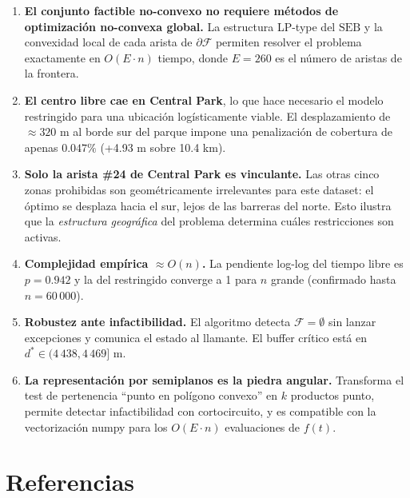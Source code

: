 \documentclass[11pt,a4paper]{article}
\theoremstyle{definition}
\theoremstyle{remark}
\newcommand{\FF}{\mathcal{F}}
\newcommand{\seb}{\mathrm{SEB}}
\begin{document}
\begin{enumerate}
  \item \textbf{El conjunto factible no-convexo no requiere métodos de
        optimización no-convexa global.}  La estructura LP-type del $\seb$ y
        la convexidad local de cada arista de $\partial\FF$ permiten resolver
        el problema exactamente en $O(E \cdot n)$ tiempo, donde $E = 260$ es
        el número de aristas de la frontera.

  \item \textbf{El centro libre cae en Central Park}, lo que hace necesario el
        modelo restringido para una ubicación logísticamente viable.  El
        desplazamiento de $\approx 320$ m al borde sur del parque impone una
        penalización de cobertura de apenas $0.047\%$ (+4.93 m sobre 10.4 km).

  \item \textbf{Solo la arista \#24 de Central Park es vinculante.}  Las otras
        cinco zonas prohibidas son geométricamente irrelevantes para este
        dataset: el óptimo se desplaza hacia el sur, lejos de las barreras
        del norte.  Esto ilustra que la \emph{estructura geográfica} del
        problema determina cuáles restricciones son activas.

  \item \textbf{Complejidad empírica $\approx O(n)$.}  La pendiente log-log
        del tiempo libre es $p = 0.942$ y la del restringido converge a 1
        para $n$ grande (confirmado hasta $n = 60\,000$).

  \item \textbf{Robustez ante infactibilidad.}  El algoritmo detecta
        $\FF = \emptyset$ sin lanzar excepciones y comunica el estado al
        llamante.  El buffer crítico está en $d^* \in (4\,438, 4\,469]$ m.

  \item \textbf{La representación por semiplanos es la piedra angular.}
        Transforma el test de pertenencia ``punto en polígono convexo'' en
        $k$ productos punto, permite detectar infactibilidad con cortocircuito,
        y es compatible con la vectorización numpy para los $O(E \cdot n)$
        evaluaciones de $f(t)$.
\end{enumerate}

\section*{Referencias}
\end{document}
